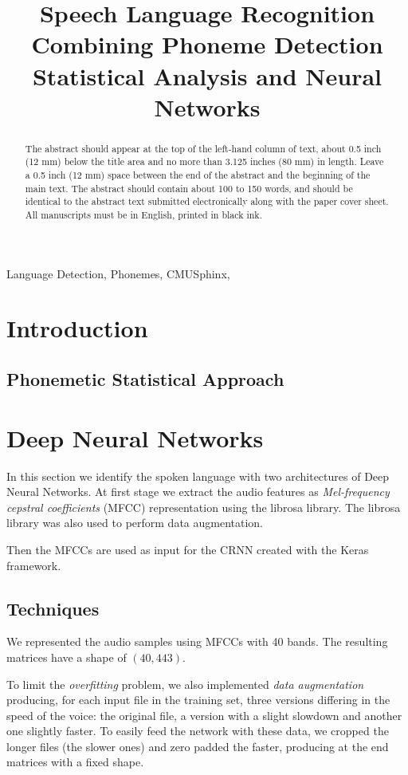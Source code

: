 \documentclass{article}
\title{Speech Language Recognition Combining Phoneme Detection Statistical Analysis and Neural Networks}
\begin{document}
%
\maketitle
%
\begin{abstract}
The abstract should appear at the top of the left-hand column of text, about
0.5 inch (12 mm) below the title area and no more than 3.125 inches (80 mm) in
length.  Leave a 0.5 inch (12 mm) space between the end of the abstract and the
beginning of the main text.  The abstract should contain about 100 to 150
words, and should be identical to the abstract text submitted electronically
along with the paper cover sheet.  All manuscripts must be in English, printed
in black ink.
\end{abstract}
%
\begin{keywords}
Language Detection, Phonemes, CMUSphinx,
\end{keywords}
%
\section{Introduction}
\label{sec:intro}

\subsection{Phonemetic Statistical Approach}
\vfill\pagebreak

\section{Deep Neural Networks}
\label{sec:dnn}
In this section we identify the spoken language with two architectures of Deep Neural Networks. At first stage we extract the audio features as \emph{Mel-frequency cepstral coefficients} (MFCC) representation using the librosa library. The librosa library was also used to perform data augmentation.
 
Then the MFCCs are used as input for the CRNN created with the Keras framework.

\subsection{Techniques}
\label{subsec:dnn-tech}
We represented the audio samples using MFCCs with 40 bands. The resulting matrices have a shape of $(40, 443)$.

To limit the \emph{overfitting} problem, we also implemented \emph{data augmentation} producing, for each input file in the training set, three versions differing in the speed of the voice: the original file, a version with a slight slowdown and another one slightly faster. To easily feed the network with these data, we cropped the longer files (the slower ones) and zero padded the faster, producing at the end matrices with a fixed shape.
\end{document}
